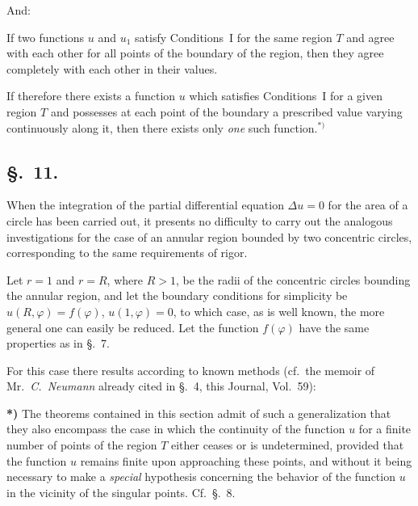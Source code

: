 \documentclass{article}
\begin{document}
And:



If two functions $u$ and $u_1$ satisfy Conditions~I for the same region $T$ and agree with each other for all points of the boundary of the region, then they agree completely with each other in their values.



If therefore there exists a function $u$ which satisfies Conditions~I for a given region $T$ and possesses at each point of the boundary a prescribed value varying continuously along it, then there exists only \emph{one} such function.${}^{*)}$



\subsection*{§.~11.}



When the integration of the partial differential equation $\Delta u = 0$ for the area of a circle has been carried out, it presents no difficulty to carry out the analogous investigations for the case of an annular region bounded by two concentric circles, corresponding to the same requirements of rigor.



Let $r = 1$ and $r = R$, where $R > 1$, be the radii of the concentric circles bounding the annular region, and let the boundary conditions for simplicity be $u(R, \varphi) = f(\varphi)$, $u(1, \varphi) = 0$, to which case, as is well known, the more general one can easily be reduced. Let the function $f(\varphi)$ have the same properties as in §.~7.



For this case there results according to known methods (cf.~the memoir of Mr.~\emph{C.~Neumann} already cited in §.~4, this Journal, Vol.~59):









\textbf{*)} The theorems contained in this section admit of such a generalization that they also encompass the case in which the continuity of the function $u$ for a finite number of points of the region $T$ either ceases or is undetermined, provided that the function $u$ remains finite upon approaching these points, and without it being necessary to make a \emph{special} hypothesis concerning the behavior of the function $u$ in the vicinity of the singular points. Cf.~§.~8.
\end{document}
